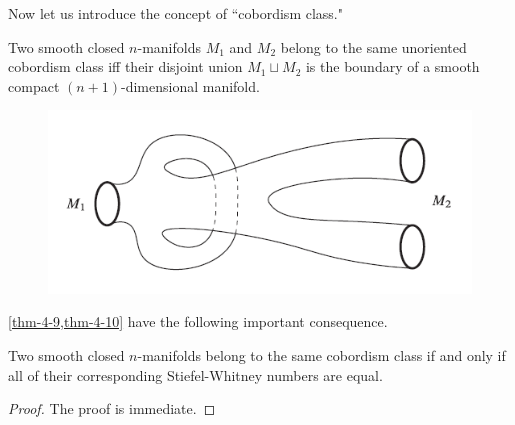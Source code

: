 Now let us introduce the concept of ``cobordism class."

\begin{definition}\label{def:4-3}
Two smooth closed $n$-manifolds $M_1$ and $M_2$ belong
to the same unoriented cobordism class iff their disjoint union $M_1 \sqcup M_2$
is the boundary of a smooth compact $(n+1)$-dimensional manifold.	
\end{definition}
\begin{figure}[!htb]
	\centering\includegraphics[scale=.8]{fig6}
\end{figure}
\cref{thm-4-9,thm-4-10} have the following important consequence.
\begin{corollary}\label{cor-4-11}
Two smooth closed $n$-manifolds belong to
the same cobordism class if and only if all of their corresponding
Stiefel-Whitney numbers are equal.	
\end{corollary}
\begin{proof}
	The proof is immediate.
\end{proof}

